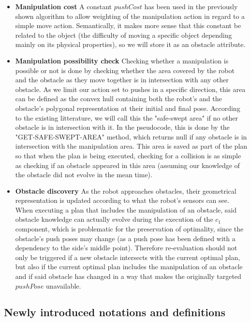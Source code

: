 \begin{itemize}
  \item \textbf{Manipulation cost} A constant $pushCost$ has been used in the previously shown algorithm to allow weighting of the manipulation action in regard to a simple move action. Semantically, it makes more sense that this constant be related to the object (the difficulty of moving a specific object depending mainly on its physical properties), so we will store it as an obstacle attribute.
  \item \textbf{Manipulation possibility check} Checking whether a manipulation is possible or not is done by checking whether the area covered by the robot and the obstacle as they move together is in intersection with any other obstacle. As we limit our action set to pushes in a specific direction, this area can be defined as the convex hull containing both the robot's and the obstacle's polygonal representation at their initial and final pose. According to the existing litterature, we will call this the "safe-swept area" if no other obstacle is in intersection with it. In the pseudocode, this is done by the "GET-SAFE-SWEPT-AREA" method, which returns null if any obstacle is in intersection with the manipulation area. This area is saved as part of the plan so that when the plan is being executed, checking for a collision is as simple as checking if an obstacle appeared in this area (assuming our knowledge of the obstacle did not evolve in the mean time).
  \item \textbf{Obstacle discovery} As the robot approaches obstacles, their geometrical representation is updated according to what the robot's sensors can see. When executing a plan that includes the manipulation of an obstacle, said obstacle knowledge can actually evolve during the execution of the $c_{1}$ component, which is problematic for the preservation of optimality, since the obstacle's push poses may change (as a push pose has been defined with a dependency to the side's middle point). Therefore re-evaluation should not only be triggered if a new obstacle intersects with the current optimal plan, but also if the current optimal plan includes the manipulation of an obstacle and if said obstacle has changed in a way that makes the originally targeted $pushPose$ unavailable.
\end{itemize}

\subsection{Newly introduced notations and definitions}

